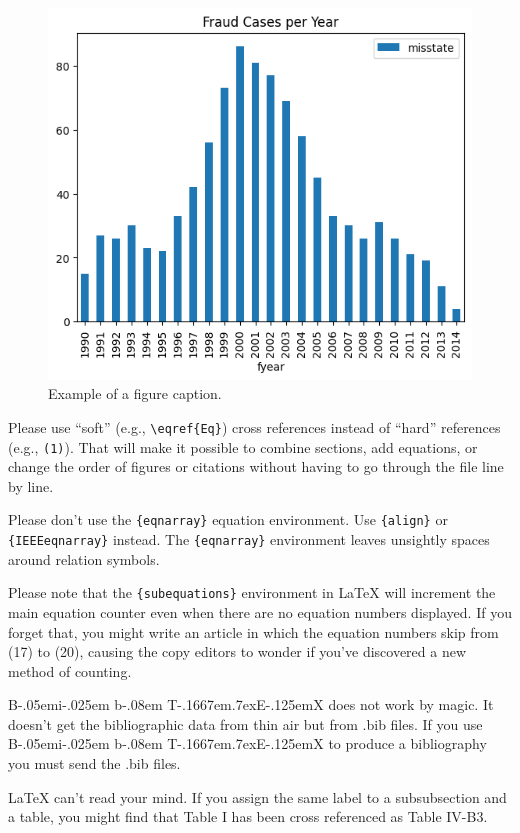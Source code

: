 \documentclass[conference]{IEEEtran}
\def\BibTeX{{\rm B\kern-.05em{\sc i\kern-.025em b}\kern-.08em
    T\kern-.1667em\lower.7ex\hbox{E}\kern-.125emX}}
\begin{document}
\begin{figure}[htbp]
\centerline{\includegraphics[width=\columnwidth]{fraud_peryear}}
\caption{Example of a figure caption.}
\label{fig}
\end{figure}

Please use ``soft'' (e.g., \verb|\eqref{Eq}|) cross references instead
of ``hard'' references (e.g., \verb|(1)|). That will make it possible
to combine sections, add equations, or change the order of figures or
citations without having to go through the file line by line.

Please don't use the \verb|{eqnarray}| equation environment. Use
\verb|{align}| or \verb|{IEEEeqnarray}| instead. The \verb|{eqnarray}|
environment leaves unsightly spaces around relation symbols.

Please note that the \verb|{subequations}| environment in {\LaTeX}
will increment the main equation counter even when there are no
equation numbers displayed. If you forget that, you might write an
article in which the equation numbers skip from (17) to (20), causing
the copy editors to wonder if you've discovered a new method of
counting.

{\BibTeX} does not work by magic. It doesn't get the bibliographic
data from thin air but from .bib files. If you use {\BibTeX} to produce a
bibliography you must send the .bib files. 

{\LaTeX} can't read your mind. If you assign the same label to a
subsubsection and a table, you might find that Table I has been cross
referenced as Table IV-B3. 
\end{document}
